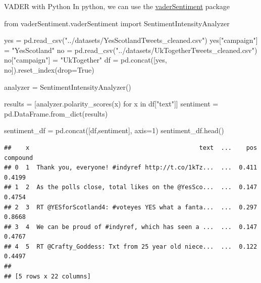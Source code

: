 \documentclass[
  10pt,
  ignorenonframetext,
  aspectratio=169]{beamer}
\newenvironment{Shaded}{\begin{snugshade}}{\end{snugshade}}
\newcommand{\ControlFlowTok}[1]{\textcolor[rgb]{0.94,0.87,0.69}{#1}}
\newcommand{\DecValTok}[1]{\textcolor[rgb]{0.86,0.86,0.80}{#1}}
\newcommand{\ImportTok}[1]{\textcolor[rgb]{0.80,0.80,0.80}{#1}}
\newcommand{\KeywordTok}[1]{\textcolor[rgb]{0.94,0.87,0.69}{#1}}
\newcommand{\NormalTok}[1]{\textcolor[rgb]{0.80,0.80,0.80}{#1}}
\newcommand{\OperatorTok}[1]{\textcolor[rgb]{0.94,0.94,0.82}{#1}}
\newcommand{\StringTok}[1]{\textcolor[rgb]{0.80,0.58,0.58}{#1}}
\newcommand{\VariableTok}[1]{\textcolor[rgb]{0.80,0.80,0.80}{#1}}
\begin{document}
\begin{frame}[fragile]{VADER with Python}
\protect\hypertarget{vader-with-python}{}
In python, we can use the
\href{https://github.com/cjhutto/vaderSentiment}{vaderSentiment} package

\medskip
\scriptsize

\begin{Shaded}
\begin{Highlighting}[]
\ImportTok{from}\NormalTok{ vaderSentiment.vaderSentiment }\ImportTok{import}\NormalTok{ SentimentIntensityAnalyzer}

\NormalTok{yes }\OperatorTok{=}\NormalTok{ pd.read\_csv(}\StringTok{"../datasets/YesScotlandTweets\_cleaned.csv"}\NormalTok{)}
\NormalTok{yes[}\StringTok{"campaign"}\NormalTok{] }\OperatorTok{=} \StringTok{"YesScotland"}
\NormalTok{no }\OperatorTok{=}\NormalTok{ pd.read\_csv(}\StringTok{"../datasets/UkTogetherTweets\_cleaned.csv"}\NormalTok{)}
\NormalTok{no[}\StringTok{"campaign"}\NormalTok{] }\OperatorTok{=} \StringTok{"UkTogether"}
\NormalTok{df }\OperatorTok{=}\NormalTok{ pd.concat([yes, no]).reset\_index(drop}\OperatorTok{=}\VariableTok{True}\NormalTok{)}

\NormalTok{analyzer }\OperatorTok{=}\NormalTok{ SentimentIntensityAnalyzer()}

\NormalTok{results }\OperatorTok{=}\NormalTok{ [analyzer.polarity\_scores(x) }\ControlFlowTok{for}\NormalTok{ x }\KeywordTok{in}\NormalTok{ df[}\StringTok{"text"}\NormalTok{]]}
\NormalTok{sentiment }\OperatorTok{=}\NormalTok{ pd.DataFrame.from\_dict(results)}

\NormalTok{sentiment\_df }\OperatorTok{=}\NormalTok{ pd.concat([df,sentiment], axis}\OperatorTok{=}\DecValTok{1}\NormalTok{)}
\NormalTok{sentiment\_df.head()}
\end{Highlighting}
\end{Shaded}

\begin{verbatim}
##    x                                               text  ...    pos  compound
## 0  1  Thank you, everyone! #indyref http://t.co/1kTz...  ...  0.411    0.4199
## 1  2  As the polls close, total likes on the @YesSco...  ...  0.147    0.4754
## 2  3  RT @YESforScotland4: #voteyes YES what a fanta...  ...  0.297    0.8668
## 3  4  We can be proud of #indyref, which has seen a ...  ...  0.147    0.4767
## 4  5  RT @Crafty_Goddess: Txt from 25 year old niece...  ...  0.122    0.4497
## 
## [5 rows x 22 columns]
\end{verbatim}
\end{frame}
\end{document}
